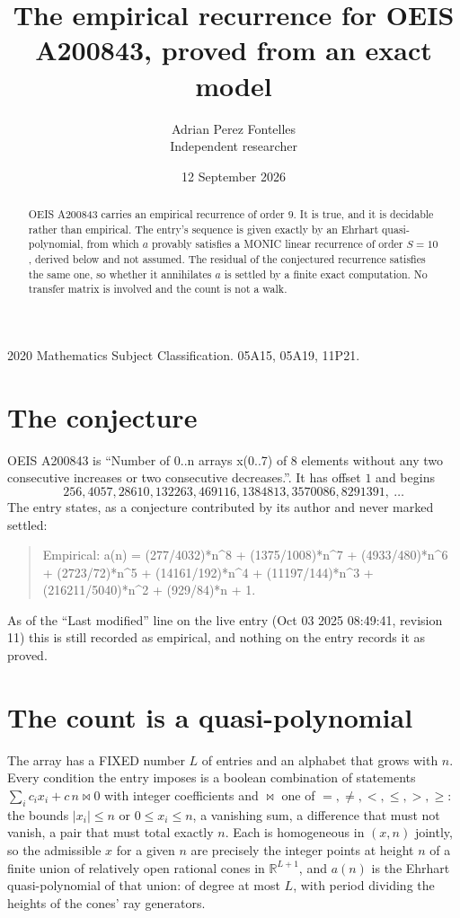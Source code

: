\documentclass[11pt,a4paper]{article}
\title{The empirical recurrence for OEIS A200843, proved from an exact model}
\author{Adrian Perez Fontelles\\ \small Independent researcher}
\date{12 September 2026}
\theoremstyle{plain}
\theoremstyle{definition}
\begin{document}
\maketitle

\begin{abstract}
OEIS A200843 carries an empirical recurrence of order $9$. It is true, and it is
decidable rather than empirical. The entry's sequence is given exactly by an Ehrhart quasi-polynomial, from
which $a$ provably satisfies a MONIC linear recurrence of order $S=10$, derived below and not
assumed. The residual of the conjectured recurrence satisfies the same one, so whether it
annihilates $a$ is settled by a finite exact computation. No transfer matrix is involved and
the count is not a walk.
\end{abstract}

\noindent\small 2020 Mathematics Subject Classification. 05A15, 05A19, 11P21.\normalsize

\section{The conjecture}

OEIS A200843 is ``Number of 0..n arrays x(0..7) of 8 elements without any two consecutive increases or two consecutive decreases.''. It has offset $1$ and begins
\[
256, 4057, 28610, 132263, 469116, 1384813, 3570086, 8291391,\ \dots
\]
The entry states, as a conjecture contributed by its author and never marked settled:
\begin{quote}
Empirical: a(n) = (277/4032)*n\^{}8 + (1375/1008)*n\^{}7 + (4933/480)*n\^{}6 + (2723/72)*n\^{}5 + (14161/192)*n\^{}4 + (11197/144)*n\^{}3 + (216211/5040)*n\^{}2 + (929/84)*n + 1.
\end{quote}
As of the ``Last modified'' line on the live entry (Oct 03 2025 08:49:41, revision 11)
this is still recorded as empirical, and nothing on the entry records it as proved.

\section{The count is a quasi-polynomial}

The array has a FIXED number $L$ of entries and an alphabet that grows with $n$. Every
condition the entry imposes is a boolean combination of statements
$\sum_i c_ix_i + c\,n \bowtie 0$ with integer coefficients and $\bowtie$ one of
$=,\ne,<,\le,>,\ge$: the bounds $|x_i|\le n$ or $0\le x_i\le n$, a vanishing sum, a difference
that must not vanish, a pair that must total exactly $n$. Each is homogeneous in $(x,n)$
jointly, so the admissible $x$ for a given $n$ are precisely the integer points at height $n$
of a finite union of relatively open rational cones in $\mathbb{R}^{L+1}$, and $a(n)$ is
the Ehrhart quasi-polynomial of that union: of degree at most $L$, with period dividing the
heights of the cones' ray generators.
\end{document}
